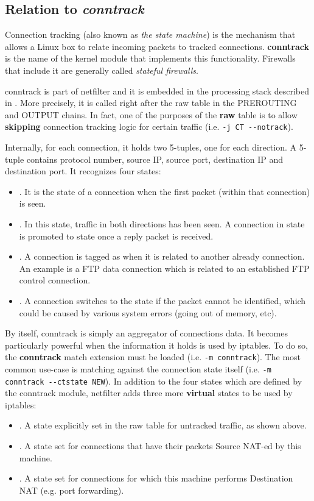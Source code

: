 \subsection{Relation to \emph{conntrack}}\label{sub-sec:conntrack}

Connection tracking (also known as \emph{the state machine}) is the mechanism
that allows a Linux box to relate incoming packets to tracked connections.
\textbf{conntrack} is the name of the kernel module that implements this
functionality.  Firewalls that include it are generally called \emph{stateful
firewalls}.

conntrack is part of netfilter and it is embedded in the processing stack
described in .  More
precisely, it is called right after the raw table in the PREROUTING and OUTPUT
chains.  In fact, one of the purposes of the \textbf{raw} table is to allow
\textbf{skipping} connection tracking logic for certain traffic (i.e.
\lstinline{-j CT --notrack}).

Internally, for each connection, it holds two 5-tuples, one for each direction.
A 5-tuple contains protocol number, source IP, source port, destination IP and
destination port.  It recognizes four states:
\begin{itemize}
  \item \NEW.  It is the state of a connection when the first packet
    (within that connection) is seen.
  \item \ESTABLISHED.  In this state, traffic in both directions has been seen.
    A connection in state \NEW is promoted to state \ESTABLISHED once a reply
    packet is received.
  \item \RELATED.  A connection is tagged as \RELATED when it is related to
    another already \ESTABLISHED connection.  An example is a FTP data
    connection which is related to an established FTP control connection.
  \item \INVALID.  A connection switches to the \INVALID state if the packet
    cannot be identified, which could be caused by various system errors (going
    out of memory, etc).
\end{itemize}

By itself, conntrack is simply an aggregator of connections data.  It becomes
particularly powerful when the information it holds is used by iptables.  To do
so, the \textbf{conntrack} match extension must be loaded (i.e.
\lstinline{-m conntrack}).  The most common use-case is matching against the
connection state itself (i.e. \lstinline{-m conntrack --ctstate NEW}).  In
addition to the four states which are defined by the conntrack module,
netfilter adds three more \textbf{virtual} states to be used by iptables:
\begin{itemize}
  \item \UNTRACKED.  A state explicitly set in the raw table for untracked
    traffic, as shown above.
  \item \SNAT.  A state set for connections that have their packets Source
    NAT-ed by this machine.
  \item \DNAT.  A state set for connections for which this machine performs
    Destination NAT (e.g. port forwarding).
\end{itemize}

